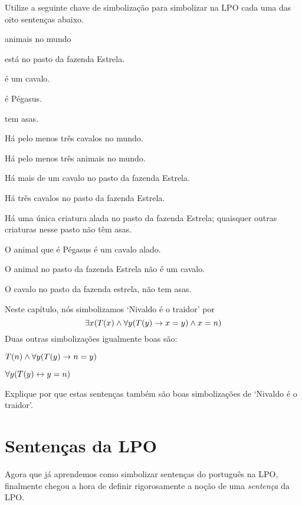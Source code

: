 \problempart Utilize a seguinte chave de simbolização para simbolizar na LPO cada uma das oito sentenças abaixo.
\begin{center}
\begin{ekey}
\item[\text{domínio}] animais no mundo
\item[\atom{E}{x}]  está no pasto da fazenda Estrela.
\item[\atom{C}{x}]  é um cavalo.
\item[\atom{P}{x}]  é Pégasus.
\item[\atom{A}{x}]  tem asas.
\end{ekey}
\end{center}
\begin{earg}
\item Há pelo menos três cavalos no mundo.
\item Há pelo menos três animais no mundo.
\item Há mais de um cavalo no pasto da fazenda Estrela.
\item Há três cavalos no pasto da fazenda Estrela.
\item Há uma única criatura alada no pasto da fazenda Estrela; quaisquer outras criaturas nesse pasto não têm asas.
\item O animal que é Pégasus é um cavalo alado.
\item O animal no pasto da fazenda Estrela não é um cavalo.
\item O cavalo no pasto da fazenda estrela, não tem asas.
\end{earg}

\problempart
Neste capítulo, nós simbolizamos `Nivaldo é o traidor' por
$$\exists x (\mathord{T}(x) \wedge \forall y(\mathord{T}(y) \rightarrow x = y) \wedge x = n)$$
Duas outras simbolizações igualmente boas são:
	\begin{ebullet}
		\item $\mathord{T}(n) \wedge \forall y(\mathord{T}(y) \rightarrow n = y)$
		\item $\forall y(\mathord{T}(y) \leftrightarrow y = n)$
	\end{ebullet}
Explique por que estas sentenças também são boas simbolizações de `Nivaldo é o traidor'.


\chapter{Sentenças da LPO}\label{s:FOLSentences}
Agora que já aprendemos como simbolizar sentenças do português na LPO, finalmente  chegou a hora de definir rigorosamente a noção de uma \emph{sentença} da LPO.

